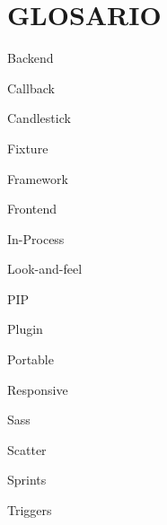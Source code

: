 \chapter*{GLOSARIO}

\begin{description}
    \item Backend
    \item Callback
    \item Candlestick
    \item Fixture
    \item Framework
    \item Frontend
    \item In-Process
    \item Look-and-feel
    \item PIP
    \item Plugin
    \item Portable
    \item Responsive
    \item Sass
    \item Scatter
    \item Sprints
    \item Triggers

\end{description}

\clearpage
